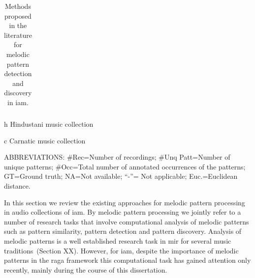 {\begin{table}
\begin{threeparttable}
\begin{centering}
\begin{tabular}{l L{1.5cm} L{2cm} L{2.5cm} L{2cm} L{1.5cm} L{1.5cm} L{1.5cm} L{1.5cm} L{1.5cm} L{1.5cm} L{1.5cm}}
			\end{tabular}
			\par \end{centering}
		
		\begin{tablenotes}
			\item[h] Hindustani music collection
			\item[c] Carnatic music collection
			\vspace{0.20cm} \\
			\item[] ABBREVIATIONS: \#Rec=Number of recordings;       \#Unq Patt=Number of unique patterns; \#Occ=Total number of annotated occurrences of the patterns; GT=Ground truth; NA=Not available; ``-''= Not applicable; Euc.=Euclidean distance.
						
		\end{tablenotes}
		\caption{Methods proposed in the literature for melodic pattern detection and discovery in \gls{iam}. }
		\label{tab:pattern_processing_iam}
	\end{threeparttable}
\end{table}


In this section we review the existing approaches for melodic pattern processing in audio collections of \gls{iam}. By melodic pattern processing we jointly refer to a number of research tasks that involve computational analysis of melodic patterns such as pattern similarity, pattern detection and pattern discovery. Analysis of melodic patterns is a well established research task in \gls{mir} for several music traditions~(Section XX). However, for \gls{iam}, despite the importance of melodic patterns in the \gls{raga} framework this computational task has gained attention only recently, mainly during the course of this dissertation. 

}
